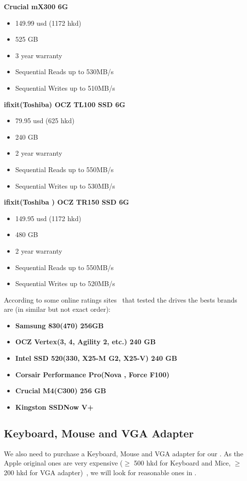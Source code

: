 \textbf{Crucial mX300 6G}

\begin{itemize}
\item 149.99 usd (1172 hkd)
\item 525 GB 
\item 3 year warranty
\item Sequential Reads up to 530MB/s
\item Sequential Writes up to 510MB/s
\end{itemize}

\textbf{ifixit(Toshiba) OCZ TL100 SSD 6G}

\begin{itemize}
\item 79.95 usd (625 hkd)
\item 240 GB 
\item 2 year warranty
\item Sequential Reads up to 550MB/s
\item Sequential Writes up to 530MB/s
\end{itemize}

\textbf{ifixit(Toshiba ) OCZ TR150 SSD 6G}

\begin{itemize}
\item 149.95 usd (1172 hkd)
\item 480 GB 
\item 2 year warranty
\item Sequential Reads up to 550MB/s
\item Sequential Writes up to 520MB/s
\end{itemize}

According to some online ratings sites~\cite{codhorratings, tomshardratings} that tested the drives the bests brands are (in similar but not exact order):

\begin{itemize}
\item \textbf{Samsung 830(470) 256GB}
\item \textbf{OCZ Vertex(3, 4, Agility 2, etc.) 240 GB}
\item \textbf{Intel SSD 520(330, X25-M G2, X25-V) 240 GB}
\item \textbf{Corsair Performance Pro(Nova , Force F100)}
\item \textbf{Crucial M4(C300) 256 GB }
\item \textbf{Kingston SSDNow V+}
\end{itemize}

\subsection{Keyboard, Mouse and VGA Adapter}
\label{keyboardMiceVga}
We also need to purchase a Keyboard, Mouse and VGA adapter for our \model. As the Apple original ones are very expensive ($\geq$ 500 hkd for Keyboard and Mice, $\geq$ 200 hkd for VGA adapter)~\cite{applekeymi,appleadapter}, we will look for reasonable ones in \market.  